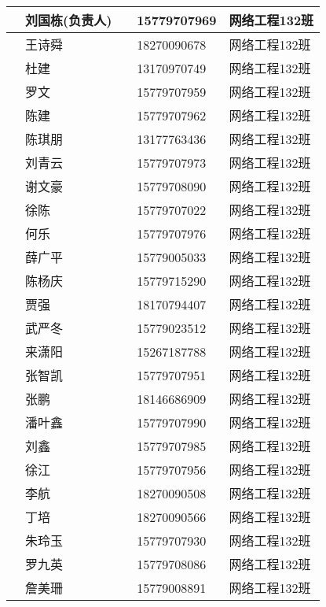 \documentclass[12pt,a4paper]{article}
\begin{document}
\begin{CJK}{UTF8}{gbsn}
\begin{flushleft}
\begin{longtable}{|l|l|l|l|l|}
    & 刘国栋(负责人)  &    &  15779707969 & 网络工程132班  \\ \hline
    & 王诗舜  &    &  18270090678 & 网络工程132班  \\ \hline
    & 杜建    &    &  13170970749 & 网络工程132班  \\ \hline
    & 罗文    &    &  15779707959 & 网络工程132班  \\ \hline
    & 陈建    &    &  15779707962 & 网络工程132班  \\ \hline
    & 陈琪朋  &    &  13177763436 & 网络工程132班  \\ \hline
    & 刘青云  &    &  15779707973 & 网络工程132班  \\ \hline
    & 谢文豪  &    &  15779708090 & 网络工程132班  \\ \hline
    & 徐陈    &    &  15779707022 & 网络工程132班  \\ \hline
    & 何乐    &    &  15779707976 & 网络工程132班  \\ \hline
    & 薛广平  &    &  15779005033 & 网络工程132班  \\ \hline
    & 陈杨庆  &    &  15779715290 & 网络工程132班  \\ \hline
    & 贾强    &    &  18170794407 & 网络工程132班  \\ \hline
    & 武严冬  &    &  15779023512 & 网络工程132班  \\ \hline
    & 来潇阳  &    &  15267187788 & 网络工程132班  \\ \hline
    & 张智凯  &    &  15779707951 & 网络工程132班  \\ \hline
    & 张鹏    &    &  18146686909 & 网络工程132班  \\ \hline
    & 潘叶鑫  &    &  15779707990 & 网络工程132班  \\ \hline
    & 刘鑫    &    &  15779707985 & 网络工程132班  \\ \hline
    & 徐江    &    &  15779707956 & 网络工程132班  \\ \hline
    & 李航    &    &  18270090508 & 网络工程132班  \\ \hline
    & 丁培    &    &  18270090566 & 网络工程132班  \\ \hline
    & 朱玲玉  &    &  15779707930 & 网络工程132班  \\ \hline
    & 罗九英  &    &  15779708086 & 网络工程132班  \\ \hline
    & 詹美珊  &    &  15779008891 & 网络工程132班  \\ \hline


\end{longtable}
\end{flushleft}
\end{CJK}
\end{document}
